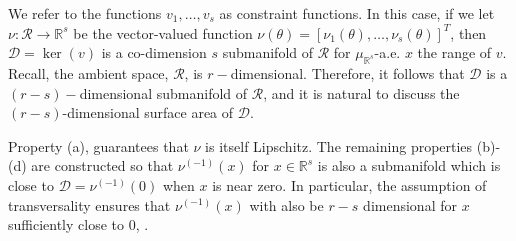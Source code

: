 \documentclass[10pt,fleqn]{article} \pdfoutput=1
\newcommand{\leo}[1]{{\color{blue}{#1}}}
\DeclareMathOperator{\1}{\mathbbm{1}} \DeclareMathOperator{\bigO}{\mc O}
\begin{document}
We refer to the functions
$v_1,\dots,v_s$ as constraint functions. In this case, if we
let $\nu:\mathcal{R}\to \mathbb{R}^s$ be the vector-valued function
$\nu(\theta) = [\nu_1(\theta),\dots,\nu_s(\theta)]^T$, then
$\mathcal{D} = \ker(v)$ is a co-dimension $s$ submanifold of
$\mathcal{R}$ for $\mu_{\mathbb{R}^s}$-a.e. $x$ the range of $v.$
Recall, the ambient space, $\mathcal{R}$, is $r-$dimensional.
Therefore, it follows that $\mathcal{D}$ is a $(r-s)-$dimensional
submanifold of $\mathcal{R}$, and it is natural to discuss the
$(r-s)$-dimensional surface area of $\mathcal{D}.$

Property (a), guarantees that $\nu$ is itself Lipschitz.  The remaining
properties (b)-(d) are constructed so that $\nu^{(-1)}(x)$ for
$x\in\mathbb{R}^s$ is also a submanifold which is close to
$\mathcal{D}=\nu^{(-1)}(0)$ when $x$ is near zero.  In particular, the
assumption of transversality ensures that $\nu^{(-1)}(x)$ with also be
$r-s$ dimensional for $x$ sufficiently close to 0, \leo{defined by the
set $\mc X$}.
\end{document}
